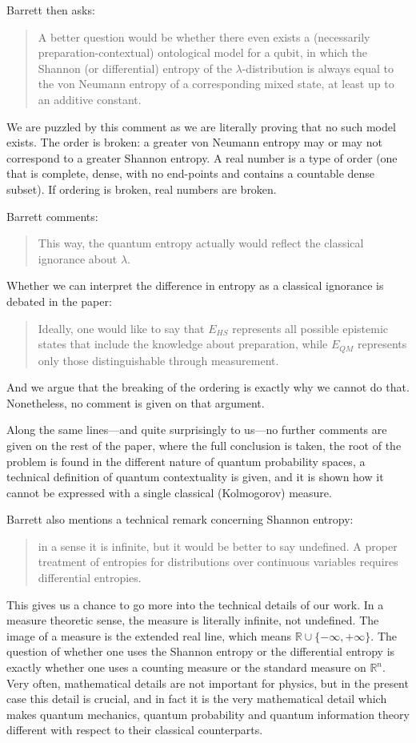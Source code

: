 \documentclass[11pt]{article}
\begin{document}
Barrett then asks:
\begin{quote}
A better question would be whether there even exists a
(necessarily preparation-contextual) ontological model for a qubit, in which the
Shannon (or differential) entropy of the $\lambda$-distribution is always equal to
the von Neumann entropy of a corresponding mixed state, at least up to an
additive constant. 
\end{quote}
We are puzzled by this comment as we are literally proving that no such model exists. The order is broken: a greater von Neumann entropy may or may not correspond to a greater Shannon entropy. A real number is a type of order (one that is complete, dense, with no end-points and contains a countable dense subset). If ordering is broken, real numbers are broken.

Barrett comments:
\begin{quote}
This way, the quantum entropy actually would reflect the
classical ignorance about $\lambda$.
\end{quote}
Whether we can interpret the difference in entropy as a classical ignorance is debated in the paper:
\begin{quote}
Ideally, one would like to say that $E_{HS}$ represents all possible epistemic states that include the knowledge about preparation, while $E_{QM}$ represents only those distinguishable through measurement.
\end{quote}
And we argue that the breaking of the ordering is exactly why we cannot do that. Nonetheless, no comment is given on that argument.

Along the same lines---and quite surprisingly to us---no further comments are given on the rest of the paper, where the full conclusion is taken, the root of the problem is found in the different nature of quantum probability spaces, a technical definition of quantum contextuality is given, and it is shown how it cannot be expressed with a single classical (Kolmogorov) measure.

Barrett also mentions a technical remark concerning Shannon entropy:
\begin{quote}
in a sense it is infinite, but it would be better to say undefined. A proper treatment of entropies for distributions over continuous variables requires differential entropies.
\end{quote}

This gives us a chance to go more into the technical details of our work. In a measure theoretic sense, the measure is literally infinite, not undefined. The image of a measure is the extended real line, which means $\mathbb{R} \cup \{-\infty, +\infty\}$. The question of whether one uses the Shannon entropy or the differential entropy is exactly whether one uses a counting measure or the standard measure on $\mathbb{R}^n$. Very often, mathematical details are not important for physics, but in the present case this detail is crucial, and in fact it is the very mathematical detail which makes quantum mechanics, quantum probability and quantum information theory different with respect to their classical counterparts.
\end{document}

